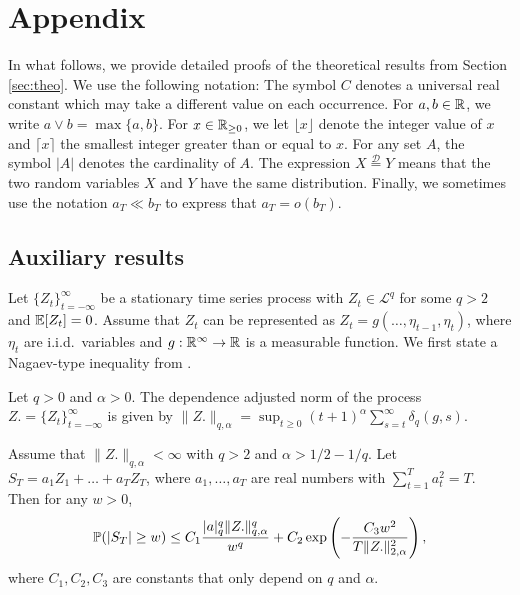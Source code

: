 \newpage
\appendix



\section{Appendix}\label{appendix}


In what follows, we provide detailed proofs of the theoretical results from Section \ref{sec:theo}. We use the following notation: The symbol $C$ denotes a universal real constant which may take a different value on each occurrence. For $a,b \in \mathbb{R}$, we write $a \vee b = \max\{a,b\}$. For $x \in \mathbb{R}_{\geq 0}$, we let $\lfloor x \rfloor$ denote the integer value of $x$ and $\lceil x \rceil$ the smallest integer greater than or equal to $x$. For any set $A$, the symbol $|A|$ denotes the cardinality of $A$. The expression $X \stackrel{\mathcal{D}}{=} Y$ means that the two random variables $X$ and $Y$ have the same distribution. Finally, we sometimes use the notation $a_T \ll b_T$ to express that $a_T = o(b_T)$. 



\subsection*{Auxiliary results}\label{subsec:appendix:aux}


Let $\{Z_t\}_{t=-\infty}^\infty$ be a stationary time series process with $Z_t \in \mathcal{L}^q$ for some $q > 2$ and $\mathbb{E}[Z_t] = 0$. Assume that $Z_t$ can be represented as $Z_t = g(\ldots, \eta_{t-1}, \eta_t)$, where $\eta_t$ are i.i.d.\ variables and $g: \mathbb{R}^\infty \to \mathbb{R}$ is a measurable function. We first state a Nagaev-type inequality from \cite{Wu2016}. 


\begin{definitionA}\label{defA-DAN} 
Let $q > 0$ and $\alpha > 0$. The dependence adjusted norm of the process $Z. = \{Z_t\}_{t=-\infty}^\infty$ is given by 
$\|Z.\|_{q, \alpha} = \sup_{t\geq 0} (t+1)^{\alpha} \sum_{s=t}^{\infty} \delta_{q}(g,s)$.
\end{definitionA}


\begin{propA}\label{theo-wu2016}
Assume that $\|Z.\|_{q, \alpha} < \infty$ with $q > 2$ and $\alpha > 1/2 - 1/q$. Let $S_T = a_1 Z_1 + \ldots + a_T Z_T$, where $a_1,\ldots,a_T$ are real numbers with $\sum_{t=1}^T a_t^2 = T$. Then for any $w>0$,
\[ \mathbb{P}(|S_T| \geq w) \leq C_1 \frac{|a|_{q}^{q}\|Z.\|^{q}_{q, \alpha}}{w^{q}} + C_2 \exp \left( - \frac{C_3 w^2} {T \|Z.\|^2_{2, \alpha}}\right), \]
where $C_1, C_2, C_3$ are constants that only depend on $q$ and $\alpha$.
\end{propA}


